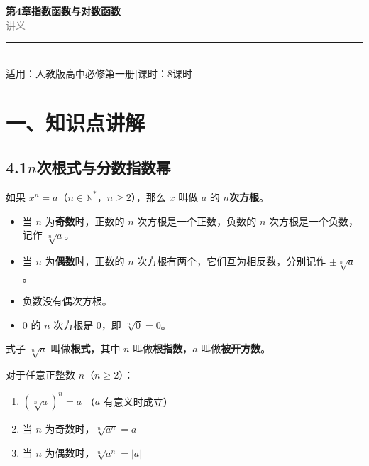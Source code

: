 \documentclass[12pt, a4paper]{ctexart}
\begin{document}
\begin{center}
{\Huge\bfseries\textcolor{mainblue}{第4章\quad 指数函数与对数函数}}\\[12pt]
{\Large\textcolor{gray}{讲\quad 义}}\\[8pt]
\rule{0.6\textwidth}{1pt}\\[8pt]
{\normalsize 适用：人教版\quad 高中必修第一册\quad |\quad 课时：8课时}
\end{center}
\vspace{10pt}


\section*{\textcolor{mainblue}{一、知识点讲解}}

\subsection*{4.1\quad $n$次根式与分数指数幂}

\begin{knowledgebox}[$n$次方根]
如果 $x^n = a$（$n \in \mathbb{N}^*$，$n \geq 2$），那么 $x$ 叫做 $a$ 的 \textbf{$n$次方根}。

\begin{itemize}[leftmargin=2em]
  \item 当 $n$ 为\textbf{奇数}时，正数的 $n$ 次方根是一个正数，负数的 $n$ 次方根是一个负数，记作 $\sqrt[n]{a}$。
  \item 当 $n$ 为\textbf{偶数}时，正数的 $n$ 次方根有两个，它们互为相反数，分别记作 $\pm\sqrt[n]{a}$。
  \item 负数没有偶次方根。
  \item $0$ 的 $n$ 次方根是 $0$，即 $\sqrt[n]{0}=0$。
\end{itemize}

式子 $\sqrt[n]{a}$ 叫做\textbf{根式}，其中 $n$ 叫做\textbf{根指数}，$a$ 叫做\textbf{被开方数}。
\end{knowledgebox}

\begin{knowledgebox}[$n$次根式的性质]
对于任意正整数 $n$（$n\geq 2$）：
\begin{enumerate}[leftmargin=2em]
  \item $(\sqrt[n]{a})^n = a$ \quad（$a$ 有意义时成立）
  \item 当 $n$ 为奇数时，$\sqrt[n]{a^n} = a$
  \item 当 $n$ 为偶数时，$\sqrt[n]{a^n} = |a|$
\end{enumerate}
\end{knowledgebox}
\end{document}
